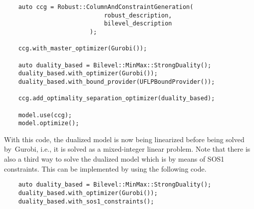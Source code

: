 \begin{lstlisting}
    auto ccg = Robust::ColumnAndConstraintGeneration(
                            robust_description,
                            bilevel_description
                        );
    
    ccg.with_master_optimizer(Gurobi());

    auto duality_based = Bilevel::MinMax::StrongDuality();
    duality_based.with_optimizer(Gurobi());
    duality_based.with_bound_provider(UFLPBoundProvider());

    ccg.add_optimality_separation_optimizer(duality_based);

    model.use(ccg);
    model.optimize();
\end{lstlisting}

With this code, the dualized model is now being linearized before being solved
by~\textsf{Gurobi}, i.e., it is solved as a mixed-integer linear problem. Note
that there is also a third way to solve the dualized model which is by means
of SOS1 constraints. This can be implemented by using the following code. 
%
\begin{lstlisting}
    auto duality_based = Bilevel::MinMax::StrongDuality();
    duality_based.with_optimizer(Gurobi());
    duality_based.with_sos1_constraints();
\end{lstlisting} 

